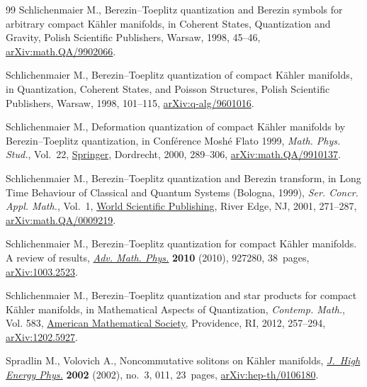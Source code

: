 \documentclass[pdftex]{sigma}
\numberwithin{equation}{section}
\begin{document}
\begin{thebibliography}{99}
Schlichenmaier M., Berezin--{T}oeplitz quantization and Berezin symbols for
 arbitrary compact K\"{a}hler manifolds, in Coherent {S}tates, {Q}uantization
 and {G}ravity, Polish Scientific Publishers, Warsaw, 1998, 45--46,
 \href{http://arxiv.org/abs/math.QA/9902066}{arXiv:math.QA/9902066}.

Schlichenmaier M., Berezin--{T}oeplitz quantization of compact {K}\"ahler
 manifolds, in Quantization, {C}oherent {S}tates, and {P}oisson {S}tructures,
 Polish Scientific Publishers, Warsaw, 1998, 101--115,
 \href{http://arxiv.org/abs/q-alg/9601016}{arXiv:q-alg/9601016}.

Schlichenmaier M., Deformation quantization of compact {K}\"ahler manifolds by
 {B}erezin--{T}oeplitz quantization, in Conf\'{e}rence Mosh\'{e} Flato 1999,
 \textit{Math. Phys. Stud.}, Vol.~22,
 \href{https://doi.org/10.1007/978-94-015-1276-3_22}{Springer}, Dordrecht,
 2000, 289--306,
 \href{http://arxiv.org/abs/math.QA/9910137}{arXiv:math.QA/9910137}.

Schlichenmaier M., Berezin--{T}oeplitz quantization and {B}erezin transform, in
 Long {T}ime {B}ehaviour of {C}lassical and {Q}uantum {S}ystems ({B}ologna,
 1999), \textit{Ser. Concr. Appl. Math.}, Vol.~1,
 \href{https://doi.org/10.1142/9789812794598_0015}{World Scientific
 Publishing}, River Edge, NJ, 2001, 271--287,
 \href{http://arxiv.org/abs/math.QA/0009219}{arXiv:math.QA/0009219}.

Schlichenmaier M., Berezin--{T}oeplitz quantization for compact {K}\"ahler
 manifolds. {A} review of results,
 \href{https://doi.org/10.1155/2010/927280}{\textit{Adv. Math. Phys.}}
 \textbf{2010} (2010), 927280, 38~pages,
 \href{http://arxiv.org/abs/1003.2523}{arXiv:1003.2523}.

Schlichenmaier M., Berezin--{T}oeplitz quantization and star products for
 compact {K}\"ahler manifolds, in Mathematical {A}spects of {Q}uantization,
 \textit{Contemp. Math.}, Vol. 583,
 \href{https://doi.org/10.1090/conm/583/11573}{American Mathematical Society},
 Providence, RI, 2012, 257--294,
 \href{http://arxiv.org/abs/1202.5927}{arXiv:1202.5927}.

Spradlin M., Volovich A., Noncommutative solitons on {K}\"ahler manifolds,
 \href{https://doi.org/10.1088/1126-6708/2002/03/011}{\textit{J.~High Energy
 Phys.}} \textbf{2002} (2002), no.~3, 011, 23~pages,
 \href{http://arxiv.org/abs/hep-th/0106180}{arXiv:hep-th/0106180}.


\end{thebibliography}
\end{document}

